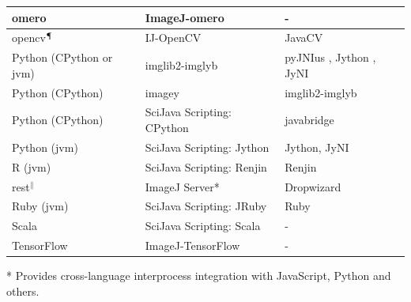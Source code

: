 \documentclass{bmcart}
\begin{document}
\begin{table}[h!]
\begin{tabular}{| l | l | l |}
      \acrshort{omero}                            \cite{omero}           & ImageJ-\acrshort{omero}               \cite{imagej_omero}            & -                                                                          \\ \hline
      \acrshort{opencv}$^\mathparagraph$          \cite{opencv}          & IJ-OpenCV                             \cite{ij_opencv}               & JavaCV                                              \cite{javacv}          \\ \hline
      Python (CPython or \acrshort{jvm})          \cite{python}          & imglib2-imglyb                        \cite{imglib2_imglyb}          & pyJNIus \cite{pyjnius}, Jython \cite{jython}, JyNI  \cite{jyni}            \\ \hline
      Python (CPython)                                                   & imagey                                \cite{imagey}                  & imglib2-imglyb                                                             \\ \hline
      Python (CPython)                                                   & SciJava Scripting: CPython            \cite{scripting_cpython}       & javabridge                                          \cite{javabridge}      \\ \hline
      Python (\acrshort{jvm})                                            & SciJava Scripting: Jython             \cite{scripting_jython}        & Jython, JyNI                                                               \\ \hline
      R (\acrshort{jvm})                          \cite{r}               & SciJava Scripting: Renjin             \cite{scripting_renjin}        & Renjin                                              \cite{renjin}          \\ \hline
      \acrshort{rest}$^\|$                        \cite{rest}            & ImageJ Server*                        \cite{imagej_server}           & Dropwizard                                          \cite{dropwizard}      \\ \hline
      Ruby (\acrshort{jvm})                       \cite{ruby}            & SciJava Scripting: JRuby              \cite{scripting_jruby}         & Ruby                                                \cite{ruby}            \\ \hline
      Scala                                       \cite{scala}           & SciJava Scripting: Scala              \cite{scripting_scala}         & -                                                                          \\ \hline
      TensorFlow                                  \cite{tensorflow}      & ImageJ-TensorFlow                     \cite{imagej_tensorflow}       & -                                                                          \\ \hline
    \end{tabular}
    \begin{flushleft}
      * Provides cross-language interprocess integration with JavaScript, Python and others.


\end{flushleft}
\end{table}
\end{document}
